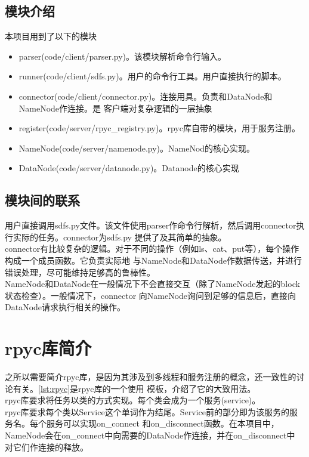 \documentclass[a4paper]{article}
\begin{document}
\subsection{模块介绍}
本项目用到了以下的模块
\begin{itemize}
    \item parser(code/client/parser.py)。该模块解析命令行输入。
    \item runner(code/client/sdfs.py)。用户的命令行工具。用户直接执行的脚本。
    \item connector(code/client/connector.py)。连接用具。负责和DataNode和NameNode作连接。是
    客户端对复杂逻辑的一层抽象
    \item register(code/server/rpyc\_registry.py)。rpyc库自带的模块，用于服务注册。
    \item NameNode(code/server/namenode.py)。NameNod的核心实现。
    \item DataNode(code/server/datanode.py)。Datanode的核心实现
\end{itemize}
\subsection{模块间的联系}
用户直接调用sdfs.py文件。该文件使用parser作命令行解析，然后调用connector执行实际的任务。connector为sdfs.py 
提供了及其简单的抽象。\\

connector有比较复杂的逻辑。对于不同的操作（例如ls、cat、put等），每个操作构成一个成员函数。它负责实际地
与NameNode和DataNode作数据传送，并进行错误处理，尽可能维持足够高的鲁棒性。\\

NameNode和DataNode在一般情况下不会直接交互（除了NameNode发起的block状态检查）。一般情况下，connector
向NameNode询问到足够的信息后，直接向DataNode请求执行相关的操作。
\section{rpyc库简介}
之所以需要简介rpyc库，是因为其涉及到多线程和服务注册的概念，还一致性的讨论有关。\autoref{lst:rpyc}是rpyc库的一个使用
模板，介绍了它的大致用法。\\

rpyc库要求将任务以类的方式实现。每个类会成为一个服务(service)。\\

rpyc库要求每个类以Service这个单词作为结尾。Service前的部分即为该服务的服务名。每个服务可以实现on\_connect
和on\_disconnect函数。在本项目中，NameNode会在on\_connect中向需要的DataNode作连接，并在on\_disconnect中
对它们作连接的释放。\\
\end{document}
